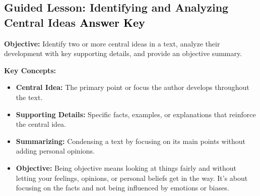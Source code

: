 \documentclass[12pt]{article}
\title{}
\date{}
\begin{document}
\subsection*{Guided Lesson: Identifying and Analyzing Central Ideas \textcolor{black}{Answer Key}}
\onehalfspacing

\begin{tcolorbox}[colframe=black!40, colback=gray!5, 
coltitle=black, colbacktitle=black!20, fonttitle=\bfseries\Large, 
title=Learning Objective, halign title=center, left=5pt, right=5pt, top=5pt, bottom=15pt]
\textbf{Objective:} Identify two or more central ideas in a text, analyze their development with key supporting details, and provide an objective summary.
\end{tcolorbox}

\vspace{1em}

\begin{tcolorbox}[colframe=black!60, colback=white, 
coltitle=black, colbacktitle=black!15, fonttitle=\bfseries\Large, 
title=Key Concepts and Vocabulary, halign title=center, left=10pt, right=10pt, top=10pt, bottom=15pt]
\textbf{Key Concepts:}
\begin{itemize}
    \item \textbf{Central Idea:} The primary point or focus the author develops throughout the text.
    \item \textbf{Supporting Details:} Specific facts, examples, or explanations that reinforce the central idea.
    \item \textbf{Summarizing:} Condensing a text by focusing on its main points without adding personal opinions.
    \item \textbf{Objective:} Being objective means looking at things fairly and without letting your feelings, opinions, or personal beliefs get in the way. It’s about focusing on the facts and not being influenced by emotions or biases. 
\end{itemize}
\end{tcolorbox}

\vspace{1em}
\end{document}

